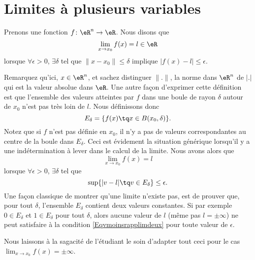 \section{Limites à plusieurs variables}
\label{SecLimVarsPlus}

Prenons une fonction $f\colon \eR^n\to \eR$. Nous disons que
\begin{equation}
    \lim_{x\to x_0}f(x)=l\in\eR
\end{equation}
lorsque $\forall \epsilon>0$, $\exists\delta$ tel que $\| x-x_0 \|\leq\delta$ implique $| f(x)-l |\leq \epsilon$. 

Remarquez qu'ici, $x\in\eR^n$, et sachez distinguer $\| . \|$, la norme dans $\eR^n$ de $| . |$ qui est la valeur absolue dans $\eR$. Une autre façon d'exprimer cette définition est que l'ensemble des valeurs atteintes par $f$ dans une boule de rayon $\delta$ autour de $x_0$ n'est pas très loin de $l$. Nous définissons donc
\begin{equation}
    E_{\delta}=\{ f(x)\tq x\in B(x_0,\delta) \}.
\end{equation}
Notez que si $f$ n'est pas définie en $x_0$, il n'y a pas de valeurs correspondantes au centre de la boule dans $E_{\delta}$. Ceci est évidement la situation générique lorsqu'il y a une indétermination à lever dans le calcul de la limite. Nous avons alors que
\begin{equation}
    \lim_{x\to x_0}f(x)=l
\end{equation}
lorsque $\forall\epsilon>0$, $\exists\delta$ tel que 
\begin{equation}        \label{Eqvmoinsrapplimdeux}
    \sup\{ | v-l |\tq v\in E_{\delta} \}\leq\epsilon.
\end{equation}
Une façon classique de montrer qu'une limite n'existe pas, est de prouver que, pour tout $\delta$, l'ensemble $E_{\delta}$ contient deux valeurs constantes. Si par exemple $0\in E_{\delta}$ et $1\in E_{\delta}$ pour tout $\delta$, alors aucune valeur de $l$ (même pas $l=\pm\infty$) ne peut satisfaire à la condition \eqref{Eqvmoinsrapplimdeux} pour toute valeur de $\epsilon$.

Nous laissons à la sagacité de l'étudiant le soin d'adapter tout ceci pour le cas $\lim_{x\to x_0}f(x)=\pm\infty$.

